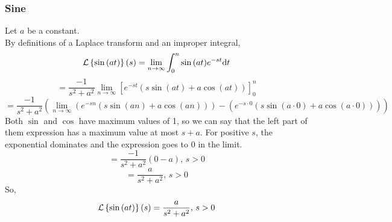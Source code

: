 \noindent
\subsubsection{Sine}
Let $a$ be a constant.\\
By definitions of a Laplace transform and an improper integral,
\begin{equation*}
	\mathcal{L}\left\{ \sin{(at)} \right\}\left(s\right) = \lim\limits_{n\to\infty}{\int_{0}^{n}{\sin{(at)}e^{-st}\mathrm{d}t}}
\end{equation*}
\begin{equation*}
	= \frac{-1}{s^2 + a^2}\lim\limits_{n\to\infty}{\left[e^{-st}\left(s\sin{(at)} + a\cos{(at)}\right)\right]_{0}^{n}}
\end{equation*}
\begin{equation*}
	 = \frac{-1}{s^2 + a^2}\left(\lim\limits_{n\to\infty}\left(e^{-sn}\left(s\sin{(an)} + a\cos{(an)}\right)\right) - \left(e^{-s\cdot 0}\left(s\sin{(a\cdot 0)} + a\cos{(a\cdot 0)}\right)\right)\right)
\end{equation*}
Both $\sin$ and $\cos$ have maximum values of 1, so we can say that the left part of them expression has a maximum value at most $s + a$. For positive $s$, the exponential dominates and the expression goes to 0 in the limit.
\begin{equation*}
	 = \frac{-1}{s^2 + a^2}\left(0 - a\right) \text{, } s > 0
\end{equation*}
\begin{equation*}
	 = \frac{a}{s^2 + a^2} \text{, } s > 0
\end{equation*}
So,
\begin{equation*}
	\mathcal{L}\left\{ \sin{(at)} \right\}\left(s\right) = \frac{a}{s^2 + a^2} \text{, } s > 0
\end{equation*}